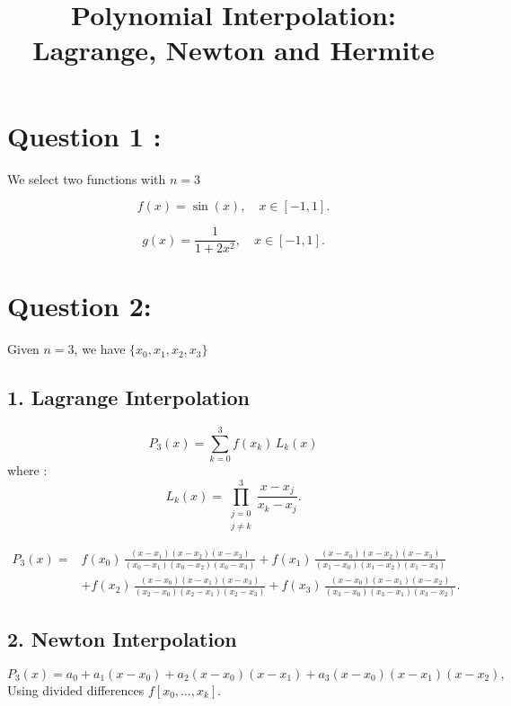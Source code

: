\documentclass[12pt,a4paper]{article}
\title{Polynomial Interpolation: Lagrange, Newton and Hermite}
\date{}
\begin{document}
\maketitle

\section*{Question 1 :}

We select two functions with $n = 3$ 


  \[
    f(x) = \sin(x), \quad x \in [-1, 1].
  \]

  \[
    g(x) = \frac{1}{1 + 2x^2}, \quad x \in [-1, 1].
  \]


\section*{Question 2:}

Given $n = 3$, we have $\{x_0, x_1, x_2, x_3\}$

\subsection*{1. Lagrange Interpolation }

\[
  P_3(x) = \sum_{k=0}^{3} f(x_k)\, L_k(x)
\]
where :
\[
  L_k(x) = \prod_{\substack{j=0 \\ j \neq k}}^{3} \frac{x - x_j}{x_k - x_j}.
\]

\begin{align*}
  P_3(x) ={}& f(x_0)\,\frac{(x-x_1)(x-x_2)(x-x_3)}{(x_0-x_1)(x_0-x_2)(x_0-x_3)}
           + f(x_1)\,\frac{(x-x_0)(x-x_2)(x-x_3)}{(x_1-x_0)(x_1-x_2)(x_1-x_3)} \\
           &+ f(x_2)\,\frac{(x-x_0)(x-x_1)(x-x_3)}{(x_2-x_0)(x_2-x_1)(x_2-x_3)}
           + f(x_3)\,\frac{(x-x_0)(x-x_1)(x-x_2)}{(x_3-x_0)(x_3-x_1)(x_3-x_2)}.
\end{align*}

\subsection*{2. Newton Interpolation }

\[
  P_3(x) = a_0 + a_1(x - x_0) + a_2(x - x_0)(x - x_1) + a_3(x - x_0)(x - x_1)(x - x_2),
\]
Using divided differences $f[x_0, \dots, x_k]$.
\end{document}
